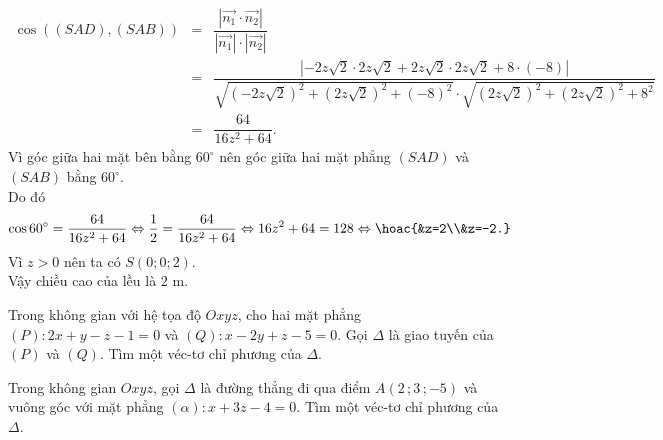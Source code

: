 \begin{bt}[Mức độ 3]
{\begin{eqnarray*}
			\cos((SAD),(SAB))&=&\dfrac{|\overrightarrow{n_1}\cdot \overrightarrow{n_2}|}{|\overrightarrow{n_1}|\cdot |\overrightarrow{n_2}|}\\
			&=&\dfrac{|-2z\sqrt{2}\cdot 2z\sqrt{2}+2z\sqrt{2}\cdot 2z\sqrt{2}+8\cdot(-8)|}{\sqrt{(-2z\sqrt{2})^2+(2z\sqrt{2})^2+(-8)^2}\cdot \sqrt{(2z\sqrt{2})^2+(2z\sqrt{2})^2+8^2}}\\
			&=&\dfrac{64}{16z^2+64}.
		\end{eqnarray*}
		Vì góc giữa hai mặt bên bằng $60^{\circ}$ nên góc giữa hai mặt phẳng $(SAD)$ và $(SAB)$ bằng $60^{\circ}$.\\
		Do đó
		$$\cos 60^{\circ}=\dfrac{64}{16z^2+64} \Leftrightarrow \dfrac{1}{2}=\dfrac{64}{16z^2+64}\Leftrightarrow 16z^2+64=128\Leftrightarrow \hoac{&z=2\\&z=-2.}$$
		Vì $z>0$ nên ta có $S(0;0;2)$.\\
		Vậy chiều cao của lều là $2$ m.
	}
\end{bt}

\begin{bt}%
	Trong không gian với hệ tọa độ $Oxyz$, cho hai mặt phẳng $(P)\colon 2x+y-z-1=0$ và $(Q)\colon x-2y+z-5=0$. Gọi $\Delta$ là giao tuyến của $(P)$ và $(Q)$. Tìm một véc-tơ chỉ phương của $\Delta$.
\end{bt}

\begin{bt}%
	Trong không gian $Oxyz$, gọi $\Delta$ là đường thẳng đi qua điểm $A( 2\,;3\,;-5 )$ và vuông góc với mặt phẳng $( \alpha ):x+3z-4=0$. Tìm một véc-tơ chỉ phương của $\Delta$.
\end{bt}

